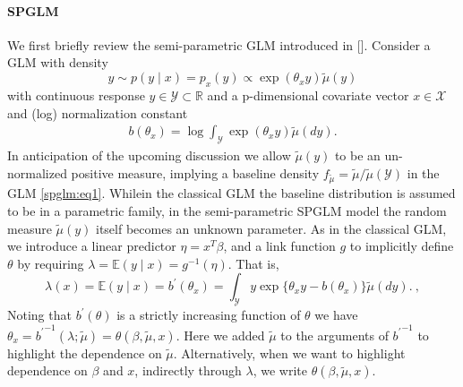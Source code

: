 \documentclass{article}[12pt]
\newcommand{\RR}{\mathbb{R}}
\newcommand{\YY}{\mathcal{Y}}
\newcommand{\blau}{\color{blue}}
\newcommand{\citeab}[1]{\citeauthor{#1} [\href{cite.#1}{\textcolor{blue}{\citeyear{#1}}}]}  %
\renewcommand{\th}{\theta}
\newcommand{\tmu}{\widetilde{\mu}}
\newcommand{\E}{\mathbb{E}}
\begin{document}
\paragraph*{\blau SPGLM}
We first briefly review the semi-parametric GLM introduced in
\citeab{rathouz2009generalized}. Consider a GLM with density
\begin{equation}
  y \sim p(y \mid x) = p_x(y) \propto \exp (\th_x y)\tmu(y) \label{spglm:eq1} 
\end{equation}
with continuous response $y \in \YY \subset \RR$ and a
p-dimensional covariate vector $x \in \mathcal{X}$ and (log)
normalization constant 
\begin{eqnarray}
b(\th_x) = \log \int_{\YY} \exp (\th_x y) \tmu(dy). \label{spglm:eq2}   
\end{eqnarray}
In anticipation of the upcoming discussion we allow $\tmu(y)$ to
be an un-normalized positive measure, implying
a  baseline density $f_{\tmu} = \tmu/\tmu(\YY)$
in the GLM \eqref{spglm:eq1}. Whilein the classical GLM the baseline
distribution is assumed to be in a parametric family,
in the semi-parametric SPGLM model the random measure $\tmu(y)$
itself becomes an unknown parameter. As in the classical GLM, we introduce a linear predictor $\eta = x^T\beta$, and a link function $g$ to implicitly define $\th$ by requiring $\lambda = \E(y \mid x) = g^{-1}(\eta)$.
That is,  
\begin{equation}
\lambda(x) = \E(y \mid x) = b^{\prime}(\th_x) = \int_{\YY} y \exp \{\th_x y - b(\th_x)\} \tmu(dy). \ ,\label{spglm:eq3}
\end{equation}
Noting that $b^{\prime}(\theta)$  is a strictly increasing
function of $\theta$ we have
$\th_x = {b^\prime}^{-1}(\lambda; \tmu)=\theta(\beta, \tmu, x)$. Here
we added $\tmu$ to the arguments of ${b^\prime}^{-1}$ to highlight the
dependence on $\tmu$. Alternatively, when we want to highlight
dependence on $\beta$ and $x$, indirectly through $\lambda$, we write
$\th(\beta, \tmu, x)$. 
\end{document}
